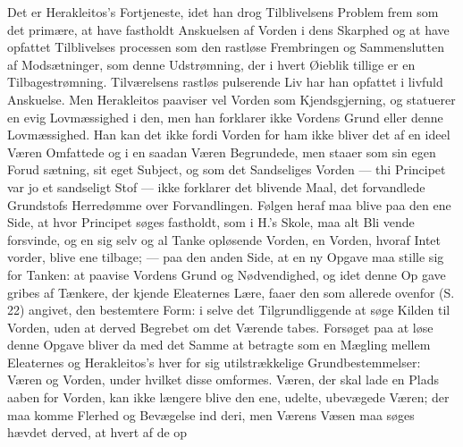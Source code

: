 \documentclass[12pt,a4paper]{book}
\newcommand{\divrule}{\begin{center}\rule{2cm}{0.4pt}\end{center}}
\begin{document}
Det er Herakleitos's Fortjeneste, idet han drog Tilblivelsens
Problem frem som det primære, at have fastholdt Anskuelsen
af Vorden i dens Skarphed og at have opfattet Tilblivelses\-%
processen som den rastløse Frembringen og Sammenslutten af
Modsætninger, som denne Udstrømning, der i hvert Øieblik
tillige er en Tilbagestrømning. Tilværelsens rastløs pulserende
Liv har han opfattet i livfuld Anskuelse. Men Herakleitos
paaviser vel Vorden som Kjendsgjerning, og statuerer en evig
Lovmæssighed i den, men han forklarer ikke Vordens Grund
eller denne Lovmæssighed. Han kan det ikke fordi Vorden
for ham ikke bliver det af en ideel Væren Omfattede og i en
saadan Væren Begrundede, men staaer som sin egen Forud\-%
sætning, sit eget Subject, og som det Sandseliges Vorden ---
thi Principet var jo et sandseligt Stof --- ikke forklarer det
blivende Maal, det forvandlede Grundstofs Herredømme over
Forvandlingen. Følgen heraf maa blive paa den ene Side, at
hvor Principet søges fastholdt, som i H.'s Skole, maa alt Bli\-%
vende forsvinde, og en sig selv og al Tanke opløsende Vorden,
en Vorden, hvoraf Intet vorder, blive ene tilbage; --- paa den
anden Side, at en ny Opgave maa stille sig for Tanken: at
paavise Vordens Grund og Nødvendighed, og idet denne Op\-%
gave gribes af Tænkere, der kjende Eleaternes Lære, faaer den
som allerede ovenfor (S. 22) angivet, den bestemtere Form:
i selve det Tilgrundliggende at søge Kilden til Vorden, uden
at derved Begrebet om det Værende tabes. Forsøget paa at
løse denne Opgave bliver da med det Samme at betragte som
en Mægling mellem Eleaternes og Herakleitos's hver for
sig utilstrækkelige Grundbestemmelser: Væren og Vorden, under
hvilket disse omformes. Væren, der skal lade en Plads aaben
for Vorden, kan ikke længere blive den ene, udelte, ubevægede
Væren; der maa komme Flerhed og Bevægelse ind deri, men
Værens Væsen maa søges hævdet derved, at hvert af de op\-%
%
%
\end{document}
